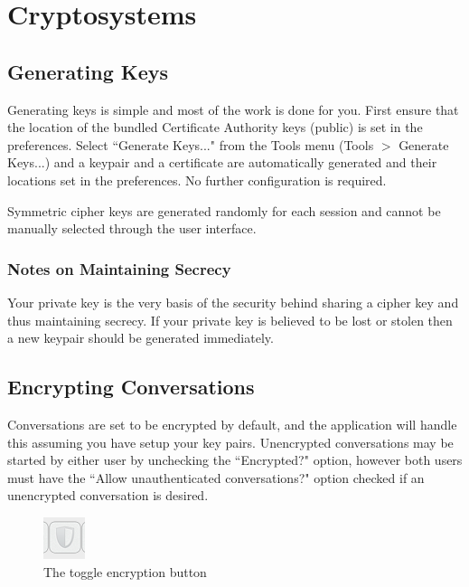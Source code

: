 \section{Cryptosystems}

  \subsection{Generating Keys}
  \label{subsec:man_gen_keys}
  
  Generating keys is simple and most of the work is done for you. First ensure that the location of the bundled Certificate Authority keys (public) is set in the preferences. Select ``Generate Keys..." from the Tools menu (Tools $>$ Generate Keys...) and a keypair and a certificate are automatically generated and their locations set in the preferences. No further configuration is required.
  
  Symmetric cipher keys are generated randomly for each session and cannot be manually selected through the user interface.

  \subsubsection{Notes on Maintaining Secrecy}
  
  Your private key is the very basis of the security behind sharing a cipher key and thus maintaining secrecy. If your private key is believed to be lost or stolen then a new keypair should be generated immediately.
  
  \subsection{Encrypting Conversations}
  
  Conversations are set to be encrypted by default, and the application will handle this assuming you have setup your key pairs. Unencrypted conversations may be started by either user by unchecking the ``Encrypted?" option, however both users must have the ``Allow unauthenticated conversations?" option checked if an unencrypted conversation is desired.
  
  \begin{figure}
    \centering
    \includegraphics[scale=0.6]{./Figures/AppD/D-5-2.png}
    \caption{The toggle encryption button}
    \label{fig:toggle_enc}
  \end{figure}
  
